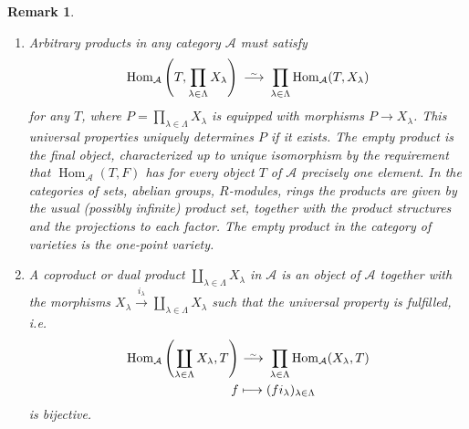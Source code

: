 \documentclass[DIV=14,parskip=full,pointednumbers]{scrartcl}
\newenvironment{alphanumerate}{\begin{enumerate}[label={$(\alph*)$},ref=\curthm]}{\end{enumerate}}
\theoremstyle{cthm}
\theoremstyle{cvarthm}
\theoremstyle{cdef}
\newtheorem*{rem*}{Remark}
\newcommand{\Aa}{\mathcal{A}}
\newcommand{\Hom}{\operatorname{Hom}}
\newcommand{\longto}{\longrightarrow}
\newcommand{\isomorphism}{
	\tikz[baseline=(a.base)] \node (a) at (0,0) {$\longrightarrow$} node[above=-0.25ex] {\tiny $\sim$};}
\newcommand{\morphism}[1][]{\overset{#1}{\longto}}
\begin{document}
	\begin{rem*}
		\begin{alphanumerate}
		\item 
			Arbitrary products in any category $\Aa$ must satisfy \begin{align*}
				\Hom_\Aa\left(T, \prod_{\lambda\in \Lambda} X_\lambda\right) \isomorphism \prod_{\lambda\in\Lambda} \Hom_\Aa(T,X_\lambda)
			\end{align*} 
			for any $T$, where $P=\prod_{\lambda\in\Lambda} X_\lambda$ is equipped with morphisms $P\to X_\lambda$. This universal properties uniquely determines $P$ if it exists. The empty product is the \emph{final object}, characterized up to unique isomorphism by the requirement that $\Hom_\Aa(T,F)$ has for every object $T$ of $\Aa$ precisely one element. In the categories of sets, abelian groups, $R$-modules, rings the products are given by the usual (possibly infinite) product set, together with the product structures and the projections to each factor. The empty product in the category of varieties is the one-point variety.
		\item 
			A \emph{coproduct} or \emph{dual product} $\coprod_{\lambda\in \Lambda} X_\lambda$ in $\Aa$ is an object of $\Aa$ together with the morphisms $X_\lambda \morphism[i_\lambda] \coprod_{\lambda\in\Lambda} X_\lambda$ such that the universal property is fulfilled, i.e. 
			\begin{align*}
				\Hom_\Aa\left(\coprod_{\lambda\in\Lambda} X_\lambda, T\right) &\isomorphism \prod_{\lambda\in\Lambda} \Hom_\Aa(X_\lambda, T)\\
				f &\longmapsto (fi_\lambda)_{\lambda\in\Lambda}
			\end{align*}
			is bijective. 
			

\end{alphanumerate}
\end{rem*}
\end{document}
